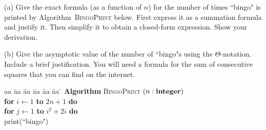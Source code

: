 
\begin{problem}
(a)
Give the exact formula (as a function of $n$) for the number of
times ``bingo" is printed by Algorithm~\textsc{BingoPrint} below.
First express it as a summation formula and justify it. Then simplify it to 
obtain a closed-form expression. Show your derivation.

\noindent
(b)
Give the asymptotic value of the
number of ``bingo"s using the $\Theta$-notation. Include a brief justification. You will need a formula
for the sum of consecutive squares that you can find on the internet.

\begin{tabbing}
aa \= aa \= aa \= aa \= aa \= aa \= \kill
\textbf{Algorithm} \textsc{BingoPrint} $(n: \mbox{\bf integer})$ \\
      \> \textbf{for} $i \leftarrow 1$ \textbf{to} $2n+1$
                         \textbf{do} \\
      \> \> \textbf{for} $j \leftarrow 1$ \textbf{to} $i^2+2i$ \textbf{do} \\
      \> \> \> print(``bingo")
\end{tabbing}
\end{problem}

